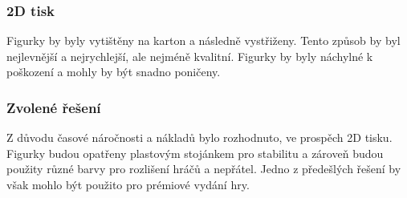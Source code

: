\subsubsection*{2D tisk}
Figurky by byly vytištěny na karton a následně vystřiženy. Tento způsob by byl nejlevnější a nejrychlejší, ale nejméně kvalitní. Figurky by byly náchylné k poškození a mohly by být snadno poničeny.

\subsubsection*{Zvolené řešení}
Z důvodu časové náročnosti a nákladů bylo rozhodnuto, ve prospěch 2D tisku. Figurky budou opatřeny plastovým stojánkem pro stabilitu a zároveň budou použity různé barvy pro rozlišení hráčů a nepřátel. Jedno z předešlých řešení by však mohlo být použito pro prémiové vydání hry.